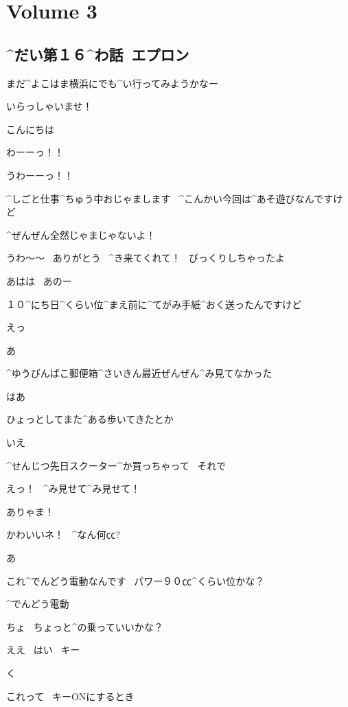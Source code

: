 \section{Volume 3}

\subsection{^{だい}{第}１６^{わ}{話}\ エプロン}

\page[5]
\Alpha まだ^{よこはま}{横浜}にでも^{い}{行}ってみようかなー

\Alpha いらっしゃいませ！

\page[6]
\Kokone こんにちは

\Alpha わーーっ！！

\Alpha うわーーっ！！

\page[7]
\Kokone ^{しごと}{仕事}^{ちゅう}{中}おじゃまします
\ ^{こんかい}{今回}は^{あそ}{遊}びなんですけど

\Alpha ^{ぜんぜん}{全然}じゃまじゃないよ！

\Alpha うわ〜〜
\ ありがとう
\ ^{き}{来}てくれて！
\ びっくりしちゃったよ

\Kokone あはは
\ あのー

\Kokone １０^{にち}{日}^{くらい}{位}^{まえ}{前}に^{てがみ}{手紙}^{おく}{送}ったんですけど

\Alpha えっ

\Alpha あ

\Alpha ^{ゆうびんばこ}{郵便箱}^{さいきん}{最近}ぜんぜん^{み}{見}てなかった

\Kokone はあ

\page[8]
\Alpha ひょっとしてまた^{ある}{歩}いてきたとか

\Kokone いえ

\Kokone ^{せんじつ}{先日}スクーター^{か}{買}っちゃって
\ それで

\Alpha えっ！
\ ^{み}{見}せて^{み}{見}せて！

\page[9]
\Alpha ありゃま！

\Alpha かわいいネ！
\ ^{なん}{何}㏄?

\Kokone あ

\Kokone これ^{でんどう}{電動}なんです
\ パワー９０㏄^{くらい}{位}かな？

\Alpha ^{でんどう}{電動}

\Alpha ちょ
\ ちょっと^{の}{乗}っていいかな？

\Kokone ええ
\ はい
\ キー

\page[10]
\Alpha く

\Alpha これって
\ キーONにするとき

